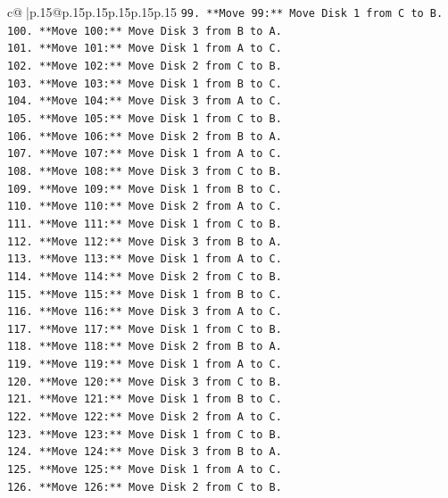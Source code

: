 \documentclass{article}
\begin{document}
{\begin{supertabular}{c@{$\;$}|p{.15\linewidth}@{}p{.15\linewidth}p{.15\linewidth}p{.15\linewidth}p{.15\linewidth}p{.15\linewidth}}
{{{\texttt{99. **Move 99:** Move Disk 1 from C to B.} \\
\texttt{100. **Move 100:** Move Disk 3 from B to A.} \\
\texttt{101. **Move 101:** Move Disk 1 from A to C.} \\
\texttt{102. **Move 102:** Move Disk 2 from C to B.} \\
\texttt{103. **Move 103:** Move Disk 1 from B to C.} \\
\texttt{104. **Move 104:** Move Disk 3 from A to C.} \\
\texttt{105. **Move 105:** Move Disk 1 from C to B.} \\
\texttt{106. **Move 106:** Move Disk 2 from B to A.} \\
\texttt{107. **Move 107:** Move Disk 1 from A to C.} \\
\texttt{108. **Move 108:** Move Disk 3 from C to B.} \\
\texttt{109. **Move 109:** Move Disk 1 from B to C.} \\
\texttt{110. **Move 110:** Move Disk 2 from A to C.} \\
\texttt{111. **Move 111:** Move Disk 1 from C to B.} \\
\texttt{112. **Move 112:** Move Disk 3 from B to A.} \\
\texttt{113. **Move 113:** Move Disk 1 from A to C.} \\
\texttt{114. **Move 114:** Move Disk 2 from C to B.} \\
\texttt{115. **Move 115:** Move Disk 1 from B to C.} \\
\texttt{116. **Move 116:** Move Disk 3 from A to C.} \\
\texttt{117. **Move 117:** Move Disk 1 from C to B.} \\
\texttt{118. **Move 118:** Move Disk 2 from B to A.} \\
\texttt{119. **Move 119:** Move Disk 1 from A to C.} \\
\texttt{120. **Move 120:** Move Disk 3 from C to B.} \\
\texttt{121. **Move 121:** Move Disk 1 from B to C.} \\
\texttt{122. **Move 122:** Move Disk 2 from A to C.} \\
\texttt{123. **Move 123:** Move Disk 1 from C to B.} \\
\texttt{124. **Move 124:** Move Disk 3 from B to A.} \\
\texttt{125. **Move 125:** Move Disk 1 from A to C.} \\
\texttt{126. **Move 126:** Move Disk 2 from C to B.} \\
}}}
\end{supertabular}}
\end{document}
